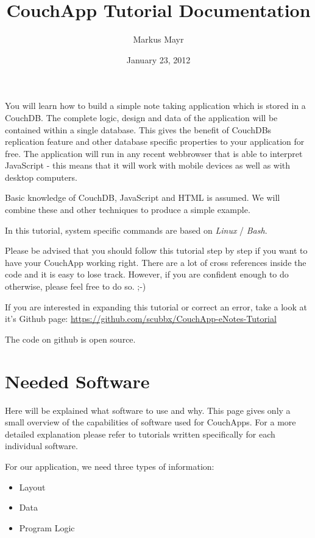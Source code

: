 \documentclass[letterpaper,10pt,english]{sphinxmanual}
\title{CouchApp Tutorial Documentation}
\date{January 23, 2012}
\author{Markus Mayr}
\begin{document}
\maketitle
\tableofcontents
{}\label{index::doc}


You will learn how to build a simple note taking application which is stored in a CouchDB. The complete logic, design and data of the application will be contained within a single database. This gives the benefit of CouchDBs replication feature and other database specific properties to your application for free.
The application will run in any recent webbrowser that is able to interpret JavaScript - this means that it will work with mobile devices as well as with desktop computers.

Basic knowledge of CouchDB, JavaScript and HTML is assumed. We will combine these and other techniques to produce a simple example.

In this tutorial, system specific commands are based on \emph{Linux} / \emph{Bash}.

Please be advised that you should follow this tutorial step by step if you want to have your CouchApp working right. There are a lot of cross references inside the code and it is easy to lose track. However, if you are confident enough to do otherwise, please feel free to do so. ;-)

If you are interested in expanding this tutorial or correct an error, take a look at it's Github page: \href{https://github.com/scubbx/CouchApp-eNotes-Tutorial}{https://github.com/scubbx/CouchApp-eNotes-Tutorial}

The code on github is open source.


\chapter{Needed Software}
\label{1-UsedSoftware:needed-software}\label{1-UsedSoftware::doc}\label{1-UsedSoftware:welcome-to-the-couchapp-tutorial}
Here will be explained what software to use and why. This page gives only a small overview of the capabilities of software used for CouchApps. For a more detailed explanation please refer to tutorials written specifically for each individual software.

For our application, we need three types of information:
\begin{itemize}
\item {} 
Layout

\item {} 
Data

\item {} 
Program Logic

\end{itemize}
\end{document}

